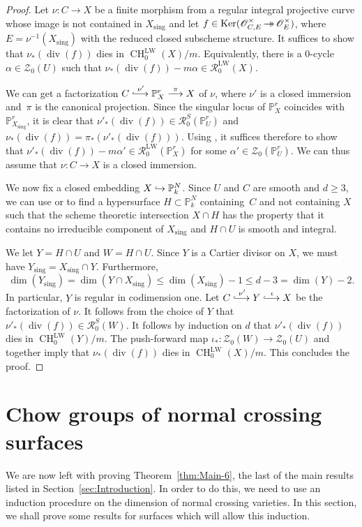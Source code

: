 \documentclass[JEP,XML,SOM,Unicode,published]{cedram}
\let\mathcal\mathscr
\def\hto{\mathrel{\lhook\joinrel\to}}
\newcommand{\onto}{\mathchoice{\to\hspace*{-5mm}\to}{\hspace*{-.5mm}\to\hspace*{-2.85mm}\to\hspace*{-.5mm}}{\to\hspace*{-3mm}\to}{\to\hspace*{-3mm}\to}}
\def\To#1{\mathchoice{\xrightarrow{\textstyle\kern4pt#1\kern3pt}}{\stackrel{#1}{\longrightarrow}}{}{}}
\def\Hto#1{\mathrel{\lhook\joinrel\To{#1}}}
\let\surj\onto
\let\inj\hto
\newcommand{\LW}{\mathrm{LW}}
\theoremstyle{definition}
\newcommand{\thmref}{Theorem~\ref}
\newcommand{\secref}{Section~\ref}
\newcommand{\sO}{{\mathcal O}}\let\cO\sO
\newcommand{\sR}{{\mathcal R}}
\newcommand{\sZ}{{\mathcal Z}}
\renewcommand{\P}{{\mathbb P}}
\DeclareMathOperator{\CH}{CH}
\DeclareMathOperator{\divf}{div}
\DeclareMathOperator{\Ker}{Ker}
\newcommand{\sing}{\mathrm{sing}}
\begin{document}
\begin{proof}
Let $\nu \colon C \to X$ be a finite morphism from a regular integral
projective curve whose image is not contained in $X_{\sing}$
and let $f \in \Ker(\sO^{\times}_{C,E} \surj \sO^{\times}_{E})$,
where $E = \nu^{-1}(X_{\sing})$ with the reduced closed subscheme
structure. It suffices to show that $\nu_*(\divf(f))$ dies in ${\CH^{\LW}_0(X)}/m$.
Equivalently, there is a $0$-cycle $\alpha \in \sZ_0(U)$ such that
$\nu_*(\divf(f)) -m \alpha \in \sR^{\LW}_0(X)$.

We can get a factorization $C \Hto{\nu'}
\P^r_X \To{\pi} X$ of $\nu$, where $\nu'$ is a closed
immersion and~$\pi$ is the canonical projection. Since
the singular locus of $\P^r_X$ coincides with $\P^r_{X_{\sing}}$, it is
clear that $\nu'_*(\divf(f)) \in \sR^{S}_0(\P^r_{U})$ and
$\nu_*(\divf(f)) = \pi_*(\nu'_*(\divf(f)))$.
Using \cite[Cor.\,2.6]{GK-1}, it suffices therefore to show that
$\nu'_*(\divf(f)) - m \alpha' \in \sR^{\LW}_0(\P^r_X)$ for some
$\alpha' \in \sZ_0(\P^r_U)$.
We can thus assume that $\nu \colon C \to X$ is a closed immersion.

We now fix a closed embedding $X \inj \P^N_k$.
Since $U$ and $C$ are smooth and
$d \ge 3$, we can use \cite[Th.\,7]{AK} or
\cite[Th.\,3.9, Cor.\,3.13]{GK} to find a hypersurface $H \subset \P^N_k$
containing~$C$ and not containing $X$
such that the scheme theoretic intersection $X \cap H$
has the property that it contains
no irreducible component of $X_\sing$ and $H \cap U$ is smooth and integral.

We let $Y = H \cap U$ and $W = H \cap U$.
Since $Y$ is a Cartier divisor on $X$, we must have $Y_\sing = X_\sing \cap Y$.
Furthermore,
\[
\dim(Y_\sing) =
\dim(Y \cap X_\sing) \le \dim(X_\sing) - 1 \le d-3 = \dim(Y) - 2.
\]
In particular, $Y$ is regular in codimension one.
Let $C \Hto{\nu'} Y \Hto{\iota} X$
be the factorization of $\nu$.
It follows from the choice of $Y$ that
$\nu'_*(\divf(f)) \in \sR^{S}_0(W)$. It follows by induction on $d$ that
$\nu'_*(\divf(f))$ dies in ${\CH^{\LW}_0(Y)}/m$.
The push-forward map $\iota_* \colon \sZ_0(W) \to \sZ_0(U)$
and \cite[Cor.\,2.6]{GK-1} together imply that
$\nu_*(\divf(f))$ dies in ${\CH^{\LW}_0(X)}/m$. This concludes the proof.
\end{proof}

\section{Chow groups of normal crossing surfaces}
\label{sec:Surface-00}
We are now left with proving \thmref{thm:Main-6}, the last of the main results
listed in \secref{sec:Introduction}.
In order to do this, we need to use an induction procedure on the dimension of
normal crossing varieties.
In this section, we shall prove some results for surfaces which will
allow this induction.
\end{document}
